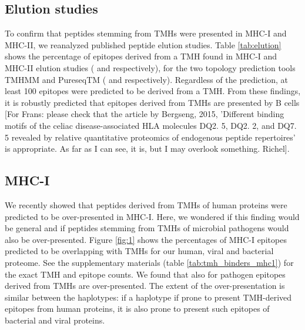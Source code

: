 \subsection{Elution studies}



To confirm that peptides stemming from TMHs were presented in MHC-I and MHC-II,
we reanalyzed published peptide elution studies.
Table \ref{tab:elution} shows the percentage of epitopes derived 
from a TMH
found in MHC-I and MHC-II elution 
studies (\cite{schellens2015comprehensive} and \cite{bergseng2015different} respectively),
for the two topology prediction tools TMHMM and 
PureseqTM (\cite{krogh2001predicting} and \cite{wang2019efficient} respectively). 
Regardless of the prediction, 
at least 100 epitopes were predicted to be derived from a TMH. 
From these findings, it is robustly predicted that
epitopes derived from TMHs are presented by B cells [For Frans: please check
that the article by Bergseng, 2015, 'Different binding motifs of the celiac 
disease-associated HLA molecules DQ2. 5, DQ2. 2, and DQ7. 5 revealed by 
relative quantitative proteomics of endogenous peptide repertoires'
is appropriate. As far as I can see, it is, but I may overlook something. Richel].


\subsection{MHC-I}

We recently showed that peptides derived from TMHs of human proteins 
were predicted to be over-presented in MHC-I. 
Here, we wondered if this finding would be general 
and if peptides stemming from TMHs of microbial pathogens 
would also be over-presented.
Figure \ref{fig:1} shows the percentages of MHC-I epitopes 
predicted to be overlapping 
with TMHs for our human, viral and bacterial proteome.
See the supplementary materials (table \ref{tab:tmh_binders_mhc1}) 
for the exact TMH and epitope counts.
We found that also for pathogen epitopes derived from TMHs are
over-presented. 
The extent of the over-presentation is similar between the haplotypes:
if a haplotype if prone to present TMH-derived epitopes from
human proteins, it is also prone to present such epitopes of
bacterial and viral proteins.

